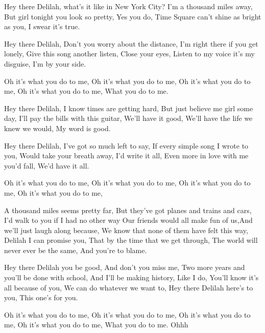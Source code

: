 \resetVars%
%
%
%
%
\MakeHeader%
\Lyrics%

 Hey there Delilah, what's it like in New York City?
I'm a thousand miles away, But girl tonight you look so pretty,
Yes you do, Time Square can't shine as bright as you,
I swear it's true.

Hey there Delilah, Don't you worry about the distance,
I'm right there if you get lonely, Give this song another listen,
Close your eyes, Listen to my voice it's my disguise,
I'm by your side.

Oh it's what you do to me, Oh it's what you do to me,
Oh it's what you do to me, Oh it's what you do to me,
What you do to me.

Hey there Delilah, I know times are getting hard,
But just believe me girl some day, I'll pay the bills with this guitar,
We'll have it good, We'll have the life we knew we would,
My word is good.

Hey there Delilah, I've got so much left to say,
If every simple song I wrote to you, Would take your breath away,
I'd write it all, Even more in love with me you'd fall,
We'd have it all.

Oh it's what you do to me, Oh it's what you do to me,
Oh it's what you do to me, Oh it's what you do to me,

\Continuechords
{}A thousand miles seems pretty far,  But they've got planes and trains and cars,
I'd walk to you if I had no other way
Our friends would all make fun of us,And we'll just laugh along because,
We know that none of them have felt this way,
Delilah I can promise you, That by the time that we get through,
The world will never ever be the same,  And you're to blame.

Hey there Delilah you be good, And don't you miss me,
Two more years and you'll be done with school, And I'll be making history,
Like I do, You'll know it's all because of you,
We can do whatever we want to,
Hey there Delilah here's to you, This one's for you.

Oh it's what you do to me, Oh it's what you do to me,
Oh it's what you do to me, Oh it's what you do to me,
What you do to me.
Ohhh

\Next
